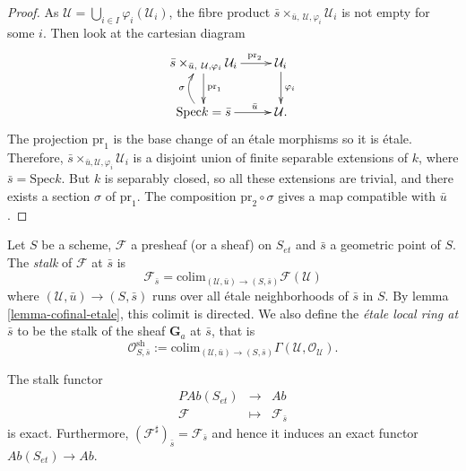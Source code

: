 \begin{proof}
As $\mathcal{U} = \bigcup_{i\in I}\varphi_i(\mathcal{U}_i)$, the fibre product
$\bar s \times_{\bar u, \ \mathcal{U}, \varphi_i} \mathcal{U}_i$ is not empty
for some $i$. Then look at the cartesian diagram
$$
\xymatrix{
{\bar s \times_{\bar u, \ \mathcal{U}, \varphi_i} \mathcal{U}_i}
\ar^{\text{pr}_1}[d] \ar^{\qquad \text{pr}_2}[r] & {\mathcal{U}_i}
\ar^{\varphi_i}[d] \\
{\text{Spec} k = \bar s} \ar@/^1pc/^{\sigma}[u] \ar^{\qquad \bar u}[r] &
{\mathcal{U}.}
}
$$
The projection $\text{pr}_1$ is the base change of an \'etale morphisms so it
is \'etale. Therefore, $\bar s \times_{\bar u , \mathcal{U}, \varphi_i}
\mathcal{U}_i$ is a disjoint union of finite separable extensions of $k$, where
$\bar s = \text{Spec} k$. But $k$ is separably closed, so all these extensions
are trivial, and there exists a section $\sigma$ of $\text{pr}_1$. The
composition
$\text{pr}_2 \circ \sigma$ gives a map compatible with $\bar u$.
\end{proof}

\begin{definition}
\label{definition-etale-local-rings}
Let $S$ be a scheme, $\mathcal{F}$ a presheaf (or a sheaf) on $S_{et}$ and
$\bar s$ a geometric point of $S$. The {\it stalk} of $\mathcal{F}$ at $\bar
s$ is
$$
\mathcal{F}_{\bar s} = \text{colim}_{(\mathcal{U}, \bar u) \to (S,\bar s)}
\mathcal{F}(\mathcal{U})
$$
where $(\mathcal{U}, \bar u) \to (S,\bar s)$ runs over all \'etale
neighborhoods of $\bar s$ in $S$. By lemma \ref{lemma-cofinal-etale},
this colimit is directed. We also define the {\it \'etale local ring at $\bar
s$} to be the stalk of the sheaf $\mathbf{G}_a$ at $\bar s$, that is
$$
\mathcal{O}_{S, \bar{s}}^\text{sh} := \text{colim}_{(\mathcal{U}, \bar u) \to
(S,\bar s)} \Gamma(\mathcal{U}, \mathcal{O}_\mathcal{U}).
$$
\end{definition}

\begin{lemma}
\label{lemma-stalk-exact}
The stalk functor
$$
\begin{matrix}
\textit{PAb}(S_{et}) & \longrightarrow & \textit{Ab}\\
\mathcal{F} & \longmapsto & \mathcal{F}_{\bar s}
\end{matrix}
$$
is exact. Furthermore, $\left(\mathcal{F}^\sharp\right)_{\bar s} =
\mathcal{F}_{\bar s}$ and hence it induces an exact functor
$\textit{Ab}(S_{et})\to \textit{Ab}$.
\end{lemma}

